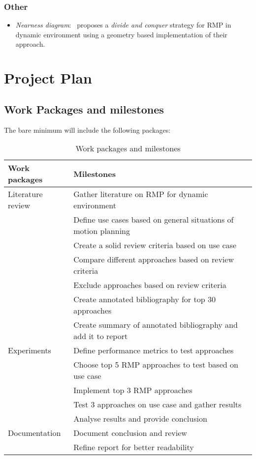\documentclass[rnd]{mas_proposal}
\begin{document}
\subsection{Other}
\begin{itemize}
    \item \textit{Nearness diagram}:~\cite{minguez2004nearness} proposes a \textit{divide and conquer} strategy for RMP in dynamic environment using a geometry based implementation of their approach.
\end{itemize}


\chapter{Project Plan}

\section{Work Packages and milestones}
The bare minimum will include the following packages:
\begin{table}[ht!]
    \centering
    \begin{tabular}{|l|l|}
        \hline
        \textbf{Work packages} & \textbf{Milestones} \\\hline
        Literature review   & Gather literature on RMP for dynamic environment\\
                            & Define use cases based on general situations of motion planning \\
                            & Create a solid review criteria based on use case\\
                            & Compare different approaches based on review criteria\\
                            & Exclude approaches based on review criteria \\ 
                            & Create annotated bibliography for top 30 approaches\\ 
                            & Create summary of annotated bibliography and add it to report\\\hline
        Experiments         & Define performance metrics to test approaches \\
                            & Choose top 5 RMP approaches to test based on use case\\
                            & Implement top 3 RMP approaches\\ 
                            & Test 3 approaches on use case and gather results \\ 
                            & Analyse results and provide conclusion \\\hline 
        Documentation       & Document conclusion and review \\
                            & Refine report for better readability \\\hline 
    
    \end{tabular}
    \caption{Work packages and milestones\label{tab:workpackagesandmilestones}}
\end{table}
\end{document}
